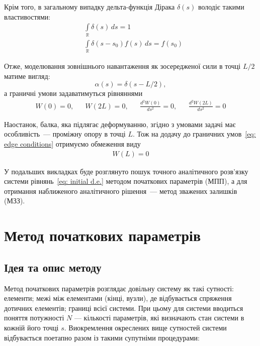 \documentclass{mathreport}
\begin{document}
Крім того, в загальному випадку дельта-функція Дірака $\delta(s)$ володіє такими властивостями:
\begin{align}
    & \int\limits_{\mathbb{R}}\delta(s)\,ds = 1 \label{eq: delta Dirac feature 1} \\
    & \int\limits_{\mathbb{R}}\delta(s-s_0)f(s)\,ds = f(s_0) \label{eq: delta Dirac feature 2}
\end{align}

Отже, моделювання зовнішнього навантаження як зосередженої сили в точці $L/2$ матиме вигляд:
\begin{equation}\label{eq: concentrated force}
    \alpha(s) = \delta(s-L/2),
\end{equation}
а граничні умови задаватимуться рівняннями
\begin{align}\label{eq: edge conditions}
    W(0)=0, && W(2L)=0, && \frac{d^2W(0)}{ds^2}=0, && \frac{d^2W(2L)}{ds^2}=0
\end{align}

Наостанок, балка, яка підлягає деформуванню, згідно з умовами задачі має особливість~--- проміжну опору в точці $L$. Тож на додачу до граничних умов~\eqref{eq: edge conditions} отримуємо обмеження виду
\begin{align}\label{eq: central condition}
    W(L)=0
\end{align}

У подальших викладках буде розглянуто пошук точного аналітичного розв'язку системи рівнянь~\eqref{eq: initial d.e.} методом початкових параметрів (МПП), а для отримання наближеного аналітичного рішення~--- метод зважених залишків (МЗЗ).

\section{Метод початкових параметрів}

\subsection*{Ідея та опис методу}

Метод початкових параметрів розглядає довільну систему як такі сутності: елементи; межі між елементами (кінці, вузли), де відбувається спряження дотичних елементів; границі всієї системи. При цьому для системи вводиться поняття потужності $N$ --- кількості параметрів, які визначають стан системи в кожній його точці $s$. Виокремлення окреслених вище сутностей системи відбувається поетапно разом із такими супутніми процедурами:
\end{document}
